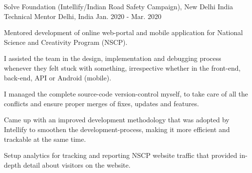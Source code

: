 

\begin{cventries}

  \cventry
    {Solve Foundation (Intellify/Indian Road Safety Campaign), New Delhi India} %
    {Technical Mentor} %
    {Delhi, India} %
    {Jan. 2020 - Mar. 2020} %
    {
      \begin{cvitems} %
        \item {Mentored development of online web-portal and mobile application for National Science and Creativity Program (NSCP).}
        \item {I assisted the team in the design, implementation and debugging process whenever they felt stuck with something, irrespective whether in the front-end, back-end, API or Android (mobile).}
        \item {I managed the complete source-code version-control myself, to take care of all the conflicts and ensure proper merges of fixes, updates and features.}
        \item {Came up with an improved development methodology that was adopted by Intellify to smoothen the development-process, making it more efficient and trackable at the same time.}
        \item {Setup analytics for tracking and reporting NSCP website traffic that provided in-depth detail about visitors on the website.}
      \end{cvitems}
    }

\end{cventries}
